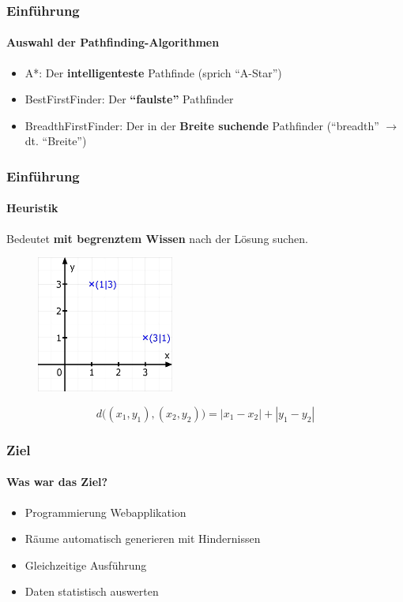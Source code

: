 \documentclass[professionalfont,serif,german]{beamer}
\begin{document}
\begin{frame}
  \frametitle{Einführung}
  \framesubtitle{Auswahl der Pathfinding-Algorithmen}
  \begin{itemize}
    \item \textcolor{pfblue}{A*}: Der \textbf{intelligenteste} Pathfinde (sprich ``A-Star'')
    \item \textcolor{pfred}{BestFirstFinder}: Der \textbf{``faulste''} Pathfinder
    \item \textcolor{pfgreen}{BreadthFirstFinder}: Der in der \textbf{Breite suchende} Pathfinder (``breadth'' $\rightarrow$ dt. ``Breite'')
  \end{itemize}
\end{frame}

\begin{frame}
  \frametitle{Einführung}
  \framesubtitle{Heuristik}
  Bedeutet \textbf{mit begrenztem Wissen} nach der Lösung suchen.
  \begin{figure}
    \centering
    \includegraphics[height=4.5cm]{img/mathegrafix.jpg}
  \end{figure}
  \begin{equation*}
    d\big((x_1,y_1),(x_2,y_2)\big) = |x_1 - x_{2}| + |y_{1} - y_{2}|
  \end{equation*}
\end{frame}


\begin{frame}
  \frametitle{Ziel}
  \framesubtitle{Was war das Ziel?}
  \begin{itemize}
    \item Programmierung Webapplikation
    \item Räume automatisch generieren mit Hindernissen %
    \item Gleichzeitige Ausführung
    \item Daten statistisch auswerten
  \end{itemize}
\end{frame}
\end{document}
